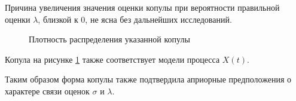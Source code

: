 Причина увеличения значения оценки копулы при вероятности правильной оценки $\lambda$, близкой к 0, не ясна без дальнейших исследований.

\begin{figure}[H]
	{}
	\caption{Плотность распределения указанной копулы}
	\label{fig:biglambda}
\end{figure}
Копула на рисунке \ref{fig:biglambda} также соответствует модели процесса $X(t)$.

Таким образом форма копулы также подтвердила априорные предположения о характере связи оценок $\sigma$ и $\lambda$.

\clearpage
